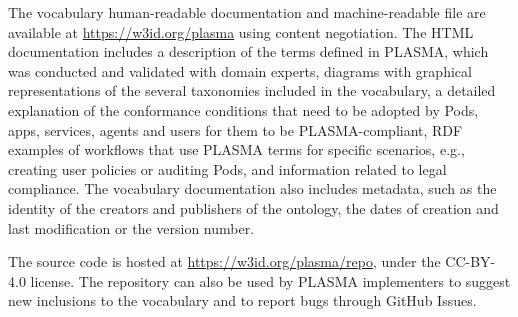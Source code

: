 The vocabulary human-readable documentation and machine-readable file are available at \url{https://w3id.org/plasma} using content negotiation.
The HTML documentation includes a description of the terms defined in PLASMA, which was conducted and validated with domain experts, diagrams with graphical representations of the several taxonomies included in the vocabulary, a detailed explanation of the conformance conditions that need to be adopted by Pods, apps, services, agents and users for them to be PLASMA-compliant, RDF examples of workflows that use PLASMA terms for specific scenarios, e.g., creating user policies or auditing Pods, and information related to legal compliance.
The vocabulary documentation also includes metadata, such as the identity of the creators and publishers of the ontology, the dates of creation and last modification or the version number.

The source code is hosted at \url{https://w3id.org/plasma/repo}, under the CC-BY-4.0 license.
The repository can also be used by PLASMA implementers to suggest new inclusions to the vocabulary and to report bugs through GitHub Issues.